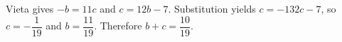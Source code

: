 Vieta gives $-b=11c$ and $c=12b-7$. Substitution yields $c=-132c-7$, so $c=-\dfrac{1}{19}$ and $b=\dfrac{11}{19}$. Therefore $b+c=\boxed{\dfrac{10}{19}}$.
